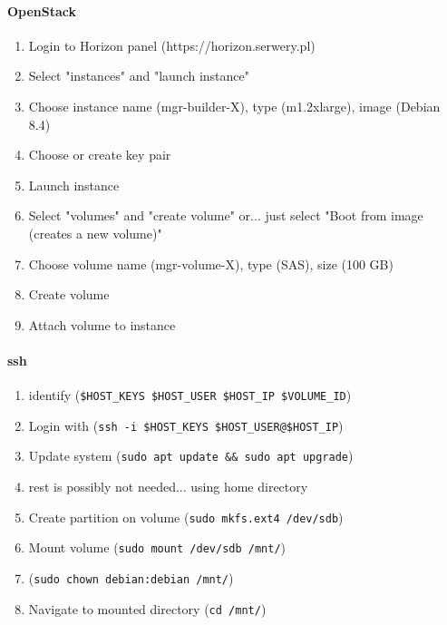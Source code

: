 \documentclass[printmode]{mgr}
\begin{document}






\paragraph{OpenStack}



\begin{enumerate}
  \item Login to Horizon panel (https://horizon.serwery.pl)
  \item Select "instances" and "launch instance"
  \item Choose instance name (mgr-builder-X), type (m1.2xlarge), image (Debian 8.4)
  \item Choose or create key pair
  \item Launch instance
  \item Select "volumes" and "create volume" or... just select "Boot from image (creates a new volume)" 
  \item Choose volume name (mgr-volume-X), type (SAS), size (100 GB)
  \item Create volume
  \item Attach volume to instance
\end{enumerate}

\paragraph{ssh}

\begin{enumerate}
  \item identify (\verb|$HOST_KEYS $HOST_USER $HOST_IP $VOLUME_ID|)
  \item Login with (\verb|ssh -i $HOST_KEYS $HOST_USER@$HOST_IP|)
  \item Update system (\verb|sudo apt update && sudo apt upgrade|)
  \item rest is possibly not needed... using home directory
  \item Create partition on volume (\verb|sudo mkfs.ext4 /dev/sdb|)
  \item Mount volume (\verb|sudo mount /dev/sdb /mnt/|)
  \item (\verb|sudo chown debian:debian /mnt/|)
  \item Navigate to mounted directory (\verb|cd /mnt/|)
\end{enumerate}
\end{document}
